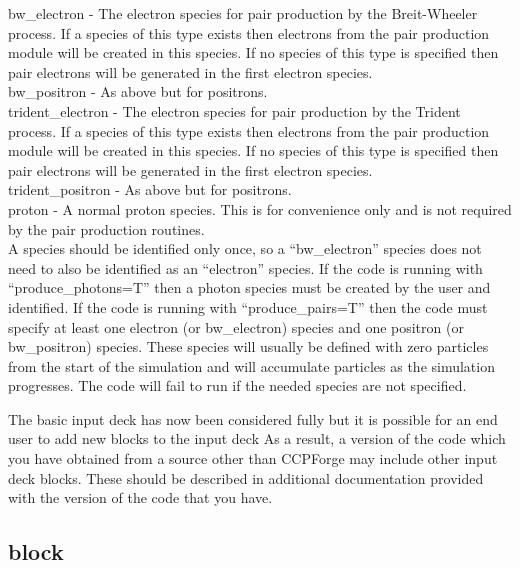 {\emphtext bw\_electron} - The electron species for pair production by the
  Breit-Wheeler process. If a species of this type exists then electrons from
  the pair production module will be created in this species. If no species of
  this type is specified then pair electrons will be generated in the first
  electron species.\\

{\emphtext bw\_positron} - As above but for positrons.\\

{\emphtext trident\_electron} - The electron species for pair production by
  the Trident process. If a species of this type exists then electrons from
  the pair production module will be created in this species. If no species
  of this type is specified then pair electrons will be generated in the first
  electron species.\\

{\emphtext trident\_positron} - As above but for positrons.\\

{\emphtext proton} - A normal proton species. This is for convenience only and
  is not required by the pair production routines.\\

A species should be identified only once, so a ``bw\_electron'' species does
not need to also be identified as an ``electron'' species. If the code is
running with ``produce\_photons=T'' then a photon species must be created by
the user and identified. If the code is running with ``produce\_pairs=T'' then
the code must specify at least one electron (or bw\_electron) species and one
positron (or bw\_positron) species. These species will usually be defined with
zero particles from the start of the simulation and will accumulate particles
as the simulation progresses. The code will fail to run if the needed
species are not specified.

The basic input deck has now been considered fully but it
 is possible for an end user to add new blocks to the input deck As a result,
a version of the code which you have obtained from a source other than
CCPForge may include other input deck blocks. These should be described in
additional documentation provided with the version of the code that you have.


\subsection{ block}
\label{sec:subset_block}

